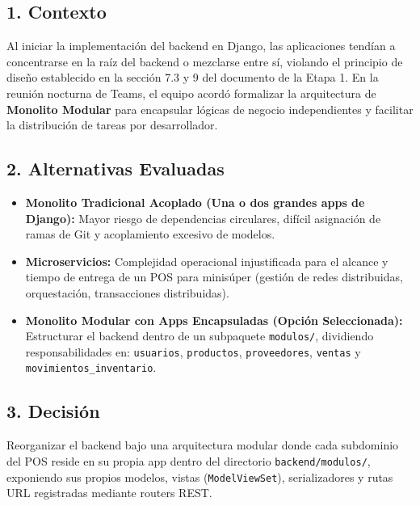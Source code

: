 \documentclass[11pt,a4paper]{article}
\begin{document}
\subsection{1. Contexto}
Al iniciar la implementación del backend en Django, las aplicaciones tendían a concentrarse en la raíz del backend o mezclarse entre sí, violando el principio de diseño establecido en la sección 7.3 y 9 del documento de la Etapa 1. En la reunión nocturna de Teams, el equipo acordó formalizar la arquitectura de \textbf{Monolito Modular} para encapsular lógicas de negocio independientes y facilitar la distribución de tareas por desarrollador.

\subsection{2. Alternativas Evaluadas}
\begin{itemize}[leftmargin=*]
    \item \textbf{Monolito Tradicional Acoplado (Una o dos grandes apps de Django):} Mayor riesgo de dependencias circulares, difícil asignación de ramas de Git y acoplamiento excesivo de modelos.
    \item \textbf{Microservicios:} Complejidad operacional injustificada para el alcance y tiempo de entrega de un POS para minisúper (gestión de redes distribuidas, orquestación, transacciones distribuidas).
    \item \textbf{Monolito Modular con Apps Encapsuladas (Opción Seleccionada):} Estructurar el backend dentro de un subpaquete \texttt{modulos/}, dividiendo responsabilidades en: \texttt{usuarios}, \texttt{productos}, \texttt{proveedores}, \texttt{ventas} y \texttt{movimientos\_inventario}.
\end{itemize}

\subsection{3. Decisión}
Reorganizar el backend bajo una arquitectura modular donde cada subdominio del POS reside en su propia app dentro del directorio \texttt{backend/modulos/}, exponiendo sus propios modelos, vistas (\texttt{ModelViewSet}), serializadores y rutas URL registradas mediante routers REST.
\end{document}
